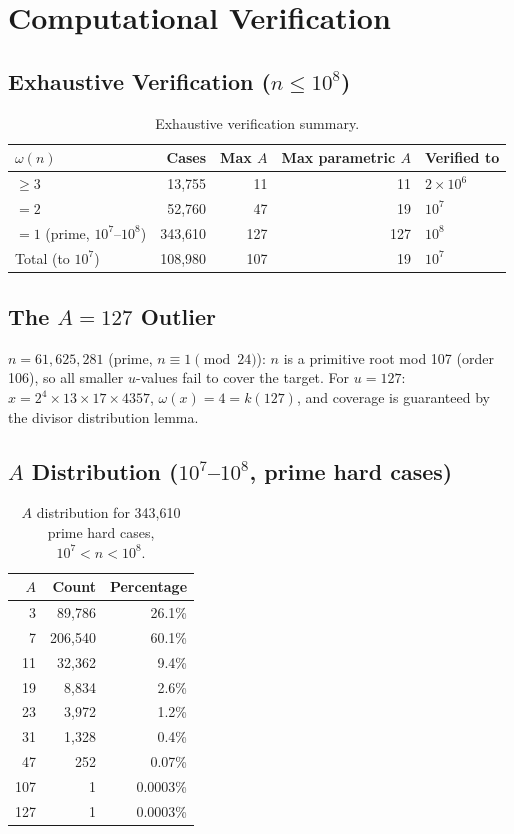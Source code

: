 \documentclass[11pt,a4paper]{article}
\theoremstyle{plain}
\theoremstyle{definition}
\begin{document}
\section{Computational Verification}

\subsection{Exhaustive Verification ($n \leq 10^8$)}

\begin{table}[h]
\centering
\caption{Exhaustive verification summary.}
\label{tab:verify}
\begin{tabular}{lrrrl}
\toprule
$\omega(n)$ & Cases & Max $A$ & Max parametric $A$ & Verified to \\
\midrule
$\geq 3$ & 13,755 & 11 & 11 & $2 \times 10^6$ \\
$= 2$ & 52,760 & 47 & 19 & $10^7$ \\
$= 1$ (prime, $10^7$--$10^8$) & 343,610 & 127 & 127 & $10^8$ \\
\midrule
Total (to $10^7$) & 108,980 & 107 & 19 & $10^7$ \\
\bottomrule
\end{tabular}
\end{table}

\subsection{The $A = 127$ Outlier}

$n = 61{,}625{,}281$ (prime, $n \equiv 1 \pmod{24}$): $n$ is a primitive root mod 107 (order 106), so all smaller $u$-values fail to cover the target. For $u = 127$: $x = 2^4 \times 13 \times 17 \times 4357$, $\omega(x) = 4 = k(127)$, and coverage is guaranteed by the divisor distribution lemma.

\subsection{$A$ Distribution ($10^7$--$10^8$, prime hard cases)}

\begin{table}[h]
\centering
\caption{$A$ distribution for 343,610 prime hard cases, $10^7 < n < 10^8$.}
\begin{tabular}{rrr}
\toprule
$A$ & Count & Percentage \\
\midrule
3 & 89,786 & 26.1\% \\
7 & 206,540 & 60.1\% \\
11 & 32,362 & 9.4\% \\
19 & 8,834 & 2.6\% \\
23 & 3,972 & 1.2\% \\
31 & 1,328 & 0.4\% \\
47 & 252 & 0.07\% \\
107 & 1 & 0.0003\% \\
127 & 1 & 0.0003\% \\
\bottomrule
\end{tabular}
\end{table}
\end{document}
